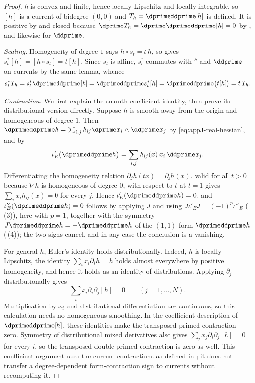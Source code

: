 \begin{proof}
$h$ is convex and finite, hence locally Lipschitz and locally integrable, so
$[h]$ is a current of bidegree $(0,0)$ and $T_h=\dprimeddprime[h]$ is defined.
It is positive by  and closed because
$\dprime T_h=\dprime\dprimeddprime[h]=0$ by
, and likewise for $\ddprime$.

\emph{Scaling.}  Homogeneity of degree $1$ says $h\circ s_t=t\,h$, so
 gives
$s_t^*[h]=[h\circ s_t]=t[h]$.  Since $s_t$ is affine, $s_t^*$ commutes with
$\dprime$ and $\ddprime$ on currents by the same lemma, whence
\[
 s_t^*T_h=s_t^*\dprimeddprime[h]=\dprimeddprime s_t^*[h]
        =\dprimeddprime\bigl(t[h]\bigr)=t\,T_h .
\]

\emph{Contraction.} We first explain the smooth coefficient identity,
then prove its distributional version directly.  Suppose $h$ is smooth away from the origin and homogeneous of degree
$1$.  Then $\dprimeddprime h=\sum_{i,j}h_{ij}\dprime x_i\wedge\ddprime x_j$
by \eqref{eq:appJ-real-hessian}, and by
,
\[
 \iota'_E\bigl(\dprimeddprime h\bigr)
 =\sum_{i,j}h_{ij}(x)\,x_i\,\ddprime x_j .
\]
Differentiating the homogeneity relation
$\partial_jh(tx)=\partial_jh(x)$, valid for all $t>0$ because $\nabla h$ is
homogeneous of degree $0$, with respect to $t$ at $t=1$ gives
$\sum_ix_ih_{ij}(x)=0$ for every $j$.  Hence
$\iota'_E(\dprimeddprime h)=0$, and $\iota''_E(\dprimeddprime h)=0$ follows by
applying $J$ and using $J\iota'_EJ=(-1)^p\iota''_E$
(\,(3)), here with $p=1$, together with the
symmetry $J\dprimeddprime h=-\dprimeddprime h$ of the $(1,1)$-form
$\dprimeddprime h$ (\,(4)); the two signs
cancel, and in any case the conclusion is a vanishing.

For general $h$, Euler's identity holds distributionally.  Indeed, $h$ is
locally Lipschitz, the identity $\sum_i x_i\partial_i h=h$ holds almost
everywhere by positive homogeneity, and hence it holds as an identity of
distributions.  Applying $\partial_j$ distributionally gives
\[
 \sum_i x_i\partial_i\partial_j[h]=0
 \qquad (j=1,\ldots,N).
\]
Multiplication by $x_i$ and distributional differentiation are continuous,
so this calculation needs no homogeneous smoothing.  In the coefficient
description of $\dprimeddprime[h]$, these identities make the transposed
primed contraction zero. Symmetry of distributional mixed derivatives
also gives $\sum_jx_j\partial_i\partial_j[h]=0$ for every $i$,
so the transposed double-primed contraction is zero as well.
This coefficient argument uses the current contractions as defined in
; it does not transfer a degree-dependent
form-contraction sign to currents without recomputing it.
\end{proof}

